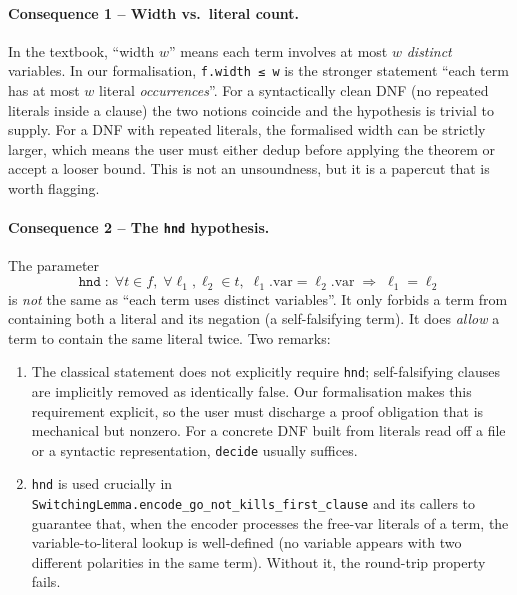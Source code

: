 \paragraph{Consequence 1 -- Width vs.\ literal count.}
In the textbook, ``width $w$'' means each term involves at most $w$
\emph{distinct} variables.  In our formalisation, \texttt{f.width ≤ w} is the
stronger statement ``each term has at most $w$ literal \emph{occurrences}''.
For a syntactically clean DNF (no repeated literals inside a clause) the two
notions coincide and the hypothesis is trivial to supply.  For a DNF with
repeated literals, the formalised width can be strictly larger, which means
the user must either dedup before applying the theorem or accept a looser
bound.  This is not an unsoundness, but it is a papercut that is worth
flagging.

\paragraph{Consequence 2 -- The \texttt{hnd} hypothesis.}
\label{hyp:hnd}
The parameter
\[
  \texttt{hnd} \;:\; \forall t\in f,\;\forall \ell_1,\ell_2\in t,\;
  \ell_1.\mathrm{var}=\ell_2.\mathrm{var}\;\Rightarrow\;\ell_1=\ell_2
\]
is \emph{not} the same as ``each term uses distinct variables''.  It only
forbids a term from containing both a literal and its negation (a
self-falsifying term).  It does \emph{allow} a term to contain the same
literal twice.  Two remarks:

\begin{enumerate}
  \item The classical statement does not explicitly require \texttt{hnd};
        self-falsifying clauses are implicitly removed as identically false.
        Our formalisation makes this requirement explicit, so the user must
        discharge a proof obligation that is mechanical but nonzero.  For a
        concrete DNF built from literals read off a file or a syntactic
        representation, \texttt{decide} usually suffices.
  \item \texttt{hnd} is used crucially in
        \texttt{SwitchingLemma.encode\_go\_not\_kills\_first\_clause} and its
        callers to guarantee that, when the encoder processes the free-var
        literals of a term, the variable-to-literal lookup is well-defined
        (no variable appears with two different polarities in the same term).
        Without it, the round-trip property fails.
\end{enumerate}

